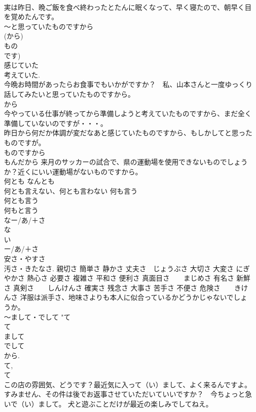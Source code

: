 \documentclass[8pt]{extreport}
\begin{document}
\begin{CJK}{UTF8}{min}
\\	実は昨日、晩ご飯を食べ終わったとたんに眠くなって、早く寝たので、朝早く目を覚めたんです。
\\	～と思っていたものですから	
\\	(から) 
\\	もの
\\	です) 
\\	感じていた 
\\	考えていた. 
\\	今晩お時間があったらお食事でもいかがですか？　私、山本さんと一度ゆっくり話してみたいと思っていたものですから。 
\\	から 
\\	今やっている仕事が終ってから準備しようと考えていたものですから、まだ全く準備していないのですが・・・。 
\\	昨日から何だか体調が変だなあと感じていたものですから、もしかしてと思ったものですが。 
\\	ものですから 
\\	もんだから 来月のサッカーの試合で、県の運動場を使用できないものでしょうか？近くにいい運動場がないものですから。 
\\	何とも	なんとも 
\\	何とも言えない、何とも言わない 何も言う　
\\	何とも言う　
\\	何もと言う　
\\	なー/あ/＋さ	
\\	な 
\\	い
\\	ー/あ/＋さ 
\\	安さ・やすさ 
\\	汚さ・きたなさ. 親切さ 簡単さ 静かさ 丈夫さ　じょうぶさ 大切さ 大変さ にぎやかさ 熱心さ 必要さ 複雑さ 平和さ 便利さ 真面目さ　　まじめさ 有名さ 新鮮さ 真剣さ　　しんけんさ 確実さ 残念さ 大事さ 苦手さ 不便さ 危険さ　　きけんさ 洋服は派手さ、地味さよりも本人に似合っているかどうかじゃないでしょうか。 
\\	～まして・でして	"て 
\\	て
\\	まして 
\\	でして 
\\	から. 
\\	て, 
\\	て 
\\	この店の雰囲気、どうです？最近気に入って（い）まして、よく来るんですよ。 すみません、その件は後でお返事させていただいていいですか？　今ちょっと急いで（い）まして。 犬と遊ぶことだけが最近の楽しみでしてねえ。 

\end{CJK}
\end{document}
